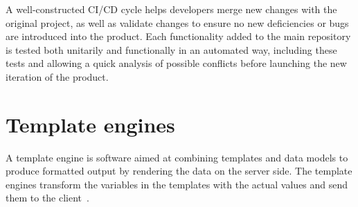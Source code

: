 \nonzeroparskip A well-constructed CI/CD cycle helps developers merge new changes with the original project, as well as validate changes to ensure no new deficiencies or bugs are introduced into the product. Each functionality added to the main repository is tested both unitarily and functionally in an automated way, including these tests and allowing a quick analysis of possible conflicts before launching the new iteration of the product.

\section{Template engines}

\nonzeroparskip A template engine is software aimed at combining templates and data models to produce formatted output by rendering the data on the server side. The template engines transform the variables in the templates with the actual values and send them to the client~\cite{template_engines}.